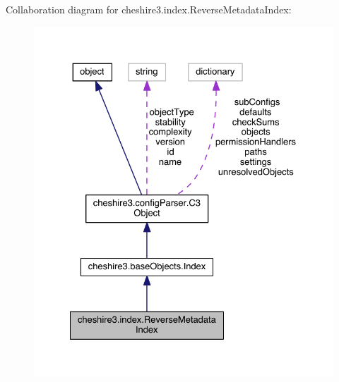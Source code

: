 Collaboration diagram for cheshire3.\-index.\-Reverse\-Metadata\-Index\-:
\nopagebreak
\begin{figure}[H]
\begin{center}
\leavevmode
\includegraphics[width=328pt]{classcheshire3_1_1index_1_1_reverse_metadata_index__coll__graph}
\end{center}
\end{figure}
